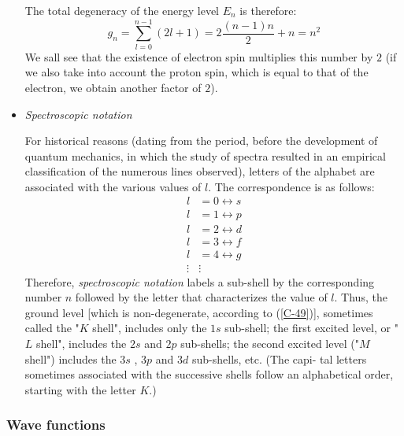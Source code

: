 \begin{itemize}
The total degeneracy of the energy level $E_n$ is therefore:
\begin{equation}\label{C-49}
	g_n=\sum_{l=0}^{n-1}(2l+1)=2\frac{(n-1)n}{2}+n=n^2
\end{equation}
We sall see that the existence of electron spin multiplies this number by $2$ (if we also take into account the proton spin, which is equal to that of the electron, we obtain another factor of $2$).

\item \textit{Spectroscopic notation}

For historical reasons (dating from the period, before the development of quantum mechanics, in which the study of spectra resulted in an empirical classification of the numerous lines observed), letters of the alphabet are associated with the various values of $l$. The correspondence is as follows:
\begin{align*}
	l&=0\leftrightarrow s\\
	l&=1\leftrightarrow p\\
	l&=2\leftrightarrow d\\
	l&=3\leftrightarrow f\\
	l&=4\leftrightarrow g\\
	\vdots & \vdots
\end{align*}
Therefore, \textit{spectroscopic notation} labels a sub-shell by the corresponding number $n$ followed by the letter that characterizes the value of $l$. Thus, the ground level [which is non-degenerate, according to (\ref{C-49})], sometimes called the "$K$ shell", includes only the $1s$ sub-shell; the first excited level, or "$L$ shell", includes the $2s$ and $2p$ sub-shells; the second excited level ("$M$ shell") includes the $3s$ , $3p$ and $3d$ sub-shells, etc. (The capi- tal letters sometimes associated with the successive shells follow an alphabetical order, starting with the letter $K$.)
\end{itemize}

\subsubsection{Wave functions}\label{sec:C-4-c}



































